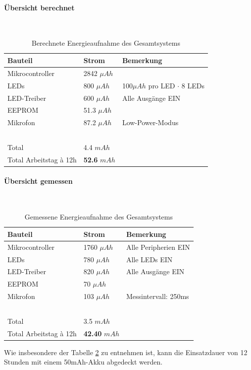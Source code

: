 \documentclass[12pt]{article}
\begin{document}
	\paragraph{Übersicht berechnet}\mbox{}\\
		\begin{table}[H] 
			\vspace*{-0.5cm}
			\centering
			\begin{tabular}{|l|l|l|}
			\hline
			\textbf{Bauteil} & \textbf{Strom} & \textbf{Bemerkung} \\ \hline
			Mikrocontroller & 2842 $\mu Ah$ & ~ \\ \hline
			LEDs & 800 $\mu Ah$ & 100$\mu Ah$ pro LED $\cdot$ 8 LEDs \\ \hline
			LED-Treiber & 600 $\mu Ah$ & Alle Ausgänge EIN \\ \hline
			EEPROM & 51.3 $\mu Ah$ & ~ \\ \hline
			Mikrofon & 87.2 $\mu Ah$ & Low-Power-Modus \\ \hline
			~ & ~ & ~ \\ \hline
			Total & 4.4 $mAh$ & ~ \\ \hline
			Total Arbeitstag à 12h & \textbf{52.6} $mAh$ & ~ \\ \hline
		\end{tabular}
		\caption{Berechnete Energieaufnahme des Gesamtsystems}
		\label{tab:leistung-berechnet}
	\end{table}
	\paragraph{Übersicht gemessen}\mbox{}\\
		\begin{table}[H] 
			\vspace*{-0.5cm}
			\centering
			\begin{tabular}{|l|l|l|}
			\hline
			\textbf{Bauteil} & \textbf{Strom} & \textbf{Bemerkung} \\ \hline
			Mikrocontroller & 1760 $\mu Ah$ & Alle Peripherien EIN \\ \hline
			LEDs & 780 $\mu Ah$ & Alle LEDs EIN\\ \hline
			LED-Treiber & 820 $\mu Ah$ & Alle Ausgänge EIN \\ \hline
			EEPROM & 70 $\mu Ah$ & ~ \\ \hline
			Mikrofon & 103 $\mu Ah$ & Messintervall: 250ms \\ \hline
			~ & ~ & ~ \\ \hline
			Total & 3.5 $mAh$ & ~ \\ \hline
			Total Arbeitstag à 12h & \textbf{42.40} $mAh$ & ~ \\ \hline
		\end{tabular}
		\caption{Gemessene Energieaufnahme des Gesamtsystems}
		\label{tab:leistung-gemessen}
		\end{table}
	Wie insbesondere der Tabelle \ref{tab:leistung-gemessen} zu entnehmen ist, kann die Einsatzdauer von 12 Stunden mit einem 50mAh-Akku abgedeckt werden.
\end{document}

